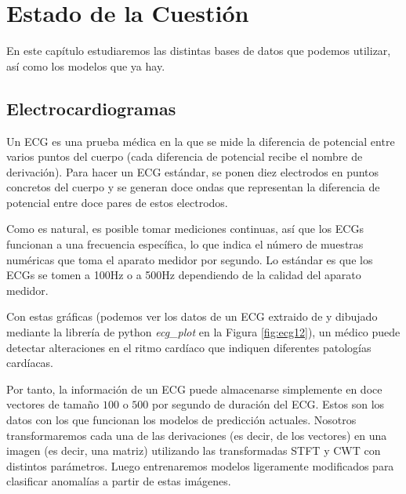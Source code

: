 \chapter{Estado de la Cuestión}
\label{cap:estadoDeLaCuestion}

\begin{resumen}
	En este capítulo estudiaremos las distintas bases de datos que podemos utilizar, así como los modelos que ya hay.
\end{resumen}

\section{Electrocardiogramas}
Un \ac{ECG} es una prueba médica en la que se mide la diferencia de potencial entre varios puntos del cuerpo (cada diferencia de potencial recibe el nombre de derivación). Para hacer un \ac{ECG} estándar, se ponen diez electrodos en puntos concretos del cuerpo y se generan doce ondas que representan la diferencia de potencial entre doce pares de estos electrodos.

Como es natural, es posible tomar mediciones continuas, así que los \ac{ECG}s funcionan a una frecuencia específica, lo que indica el número de muestras numéricas que toma el aparato medidor por segundo. Lo estándar es que los \ac{ECG}s se tomen a 100Hz o a 500Hz dependiendo de la calidad del aparato medidor.

Con estas gráficas (podemos ver los datos de un \ac{ECG} extraido de \cite{ptbxldb} y dibujado mediante la librería de python \emph{ecg\_plot} en la Figura \ref{fig:ecg12}), un médico puede detectar alteraciones en el ritmo cardíaco que indiquen diferentes patologías cardíacas.

Por tanto, la información de un \ac{ECG} puede almacenarse simplemente en doce vectores de tamaño $100$ o $500$ por segundo de duración del \ac{ECG}. Estos son los datos con los que funcionan los modelos de predicción actuales. Nosotros transformaremos cada una de las derivaciones (es decir, de los vectores) en una imagen (es decir, una matriz) utilizando las transformadas \ac{STFT} y \ac{CWT} con distintos parámetros. Luego entrenaremos modelos ligeramente modificados para clasificar anomalías a partir de estas imágenes.

